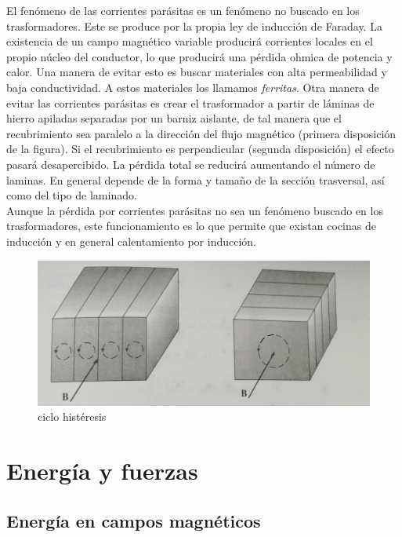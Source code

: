 \documentclass[12pt]{article}
\begin{document}
El fenómeno de las corrientes parásitas es un fenómeno no buscado en los trasformadores. Este se produce por la propia ley de inducción de Faraday. La existencia de un campo magnético variable producirá corrientes locales en el propio núcleo del conductor, lo que producirá una pérdida ohmica de potencia y calor. Una manera de evitar esto es buscar materiales con alta permeabilidad y baja conductividad. A estos materiales los llamamos \textit{ferritas}. Otra manera de evitar las corrientes parásitas es crear el trasformador a partir de láminas de hierro apiladas separadas por un barniz aislante, de tal manera que el recubrimiento sea paralelo a la dirección del flujo magnético (primera disposición de la figura). Si el recubrimiento es perpendicular (segunda disposición) el efecto pasará desapercibido. La pérdida total se reducirá aumentando el número de laminas. En general depende de la forma y tamaño de la sección trasversal, así como del tipo de laminado. \\

Aunque la pérdida por corrientes parásitas no sea un fenómeno buscado en los trasformadores, este funcionamiento es lo que permite que existan cocinas de inducción y en general calentamiento por inducción. \\

\begin{figure}[h!]
    \centering
    \includegraphics[scale=0.5]{laminacion.png}
    \caption{ciclo histéresis}
\end{figure}




\newpage

\section{Energía y fuerzas}

\subsection{Energía en campos magnéticos}
\end{document}
